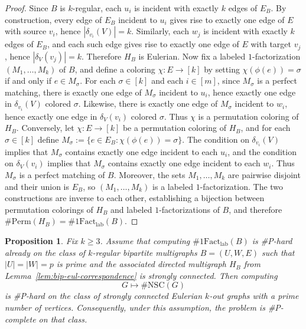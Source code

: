 \documentclass[a4paper,10pt]{amsart}
\theoremstyle{plain}
\newtheorem{proposition}[theorem]{Proposition}
\theoremstyle{definition}
\begin{document}
\begin{proof}
Since $B$ is $k$-regular, each $u_i$ is incident with exactly $k$ edges of $E_B$. By construction, every edge of $E_B$ incident to $u_i$ gives rise to exactly one edge of $E$ with source $v_i$, hence $|\delta_{v_i}(V)|=k$. Similarly, each $w_j$ is incident with exactly $k$ edges of $E_B$, and each such edge gives rise to exactly one edge of $E$ with target $v_j$, hence $|\delta_V(v_j)|=k$. Therefore $H_B$ is Eulerian.
Now fix a labeled $1$-factorization $(M_1,\dots,M_k)$ of $B$, and define a coloring $\chi:E\to[k]$ by setting $\chi(\phi(e))=\sigma$ if and only if $e\in M_\sigma$. For each $\sigma\in[k]$ and each $i\in[m]$, since $M_\sigma$ is a perfect matching, there is exactly one edge of $M_\sigma$ incident to $u_i$, hence exactly one edge in $\delta_{v_i}(V)$ colored $\sigma$. Likewise, there is exactly one edge of $M_\sigma$ incident to $w_i$, hence exactly one edge in $\delta_V(v_i)$ colored $\sigma$. Thus $\chi$ is a permutation coloring of $H_B$. Conversely, let $\chi:E\to[k]$ be a permutation coloring of $H_B$, and for each $\sigma\in[k]$ define $M_\sigma:=\{e\in E_B:\chi(\phi(e))=\sigma\}$. The condition on $\delta_{v_i}(V)$ implies that $M_\sigma$ contains exactly one edge incident to each $u_i$, and the condition on $\delta_V(v_i)$ implies that $M_\sigma$ contains exactly one edge incident to each $w_i$. Thus $M_\sigma$ is a perfect matching of $B$. Moreover, the sets $M_1,\dots,M_k$ are pairwise disjoint and their union is $E_B$, so $(M_1,\dots,M_k)$ is a labeled $1$-factorization. The two constructions are inverse to each other, establishing a bijection between permutation colorings of $H_B$ and labeled $1$-factorizations of $B$, and therefore $\#\mathrm{Perm}(H_B)=\#1\mathrm{Fact}_{\mathrm{lab}}(B)$.
\end{proof}
\begin{proposition}\label{prop:encode-1fact-into-nsc}
Fix $k\ge 3$. Assume that computing $\#1\mathrm{Fact}_{\mathrm{lab}}(B)$ is \#P-hard already on the class of $k$-regular bipartite multigraphs $B=(U,W,E)$ such that $|U|=|W|=p$ is prime and the associated directed multigraph $H_B$ from Lemma~\ref{lem:bip-eul-correspondence} is strongly connected. Then computing
\[
G\longmapsto \#\mathrm{NSC}(G)
\]
is \#P-hard on the class of strongly connected Eulerian $k$-out graphs with a prime number of vertices.
Consequently, under this assumption, the problem is \#P-complete on that class.
\end{proposition}
\end{document}
